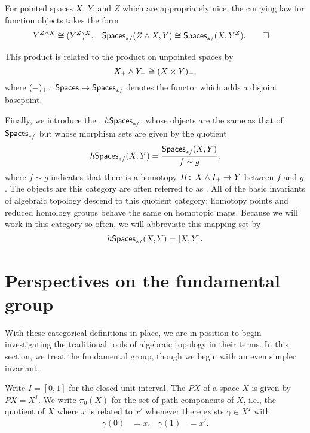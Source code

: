 \begin{corollary}
For pointed spaces $X$, $Y$, and $Z$ which are appropriately nice, the currying law for function objects takes the form
\begin{align*}
Y^{Z \wedge X} & \cong (Y^Z)^X, &
\mathsf{Spaces}_{*/}(Z \wedge X, Y) & \cong \mathsf{Spaces}_{*/}(X, Y^Z). \qed
\end{align*}
\end{corollary}

\begin{lemma}\pushQED{\qed}
This product is related to the product on unpointed spaces by \[X_+ \wedge Y_+ \cong (X \times Y)_+,\] where $(-)_+\colon\thinspace \mathsf{Spaces} \to \mathsf{Spaces}_{*/}$ denotes the functor which adds a disjoint basepoint. \qedhere \popQED
\end{lemma}

\begin{definition}\label{HoCatDefn}%
Finally, we introduce the , $h\mathsf{Spaces}_{*/}$, whose objects are the same as that of $\mathsf{Spaces}_{*/}$ but whose morphism sets are given by the quotient \[h\mathsf{Spaces}_{*/}(X, Y) = \frac{\mathsf{Spaces}_{*/}(X, Y)}{f \sim g},\] where $f \sim g$ indicates that there is a homotopy $H\colon\thinspace X \wedge I_+ \to Y$ between $f$ and $g$.
The objects are this category are often referred to as .
All of the basic invariants of algebraic topology descend to this quotient category: homotopy points and reduced homology groups behave the same on homotopic maps.
Because we will work in this category so often, we will abbreviate this mapping set by \[h\mathsf{Spaces}_{*/}(X, Y) = [X, Y].\]
\end{definition}




\section{Perspectives on the fundamental group}

With these categorical definitions in place, we are in position to begin investigating the traditional tools of algebraic topology in their terms.
In this section, we treat the fundamental group, though we begin with an even simpler invariant.

\begin{definition}
Write $I = [0, 1]$ for the closed unit interval.
The  $PX$ of a space $X$ is given by $PX = X^I$.
We write $\pi_0(X)$ for the set of path-components of $X$, i.e., the quotient of $X$ where $x$ is related to $x'$ whenever there exists $\gamma \in X^I$ with
\begin{align*}
\gamma(0) & = x, &
\gamma(1) & = x'.
\end{align*}
\end{definition}

